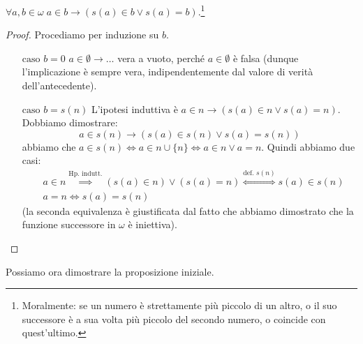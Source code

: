 \begin{lemma}
	$\forall a,b \in \omega \; a \in b \rightarrow (s(a) \in b \lor s(a) = b)$.\footnote{Moralmente: se un numero è strettamente più piccolo di un altro, o il suo successore è a sua volta più piccolo del secondo numero, o coincide con quest'ultimo.}
\end{lemma}

\begin{proof}
	Procediamo per induzione su $b$.
	\begin{itemize}
		\item[$\boxed{\text{caso $b = 0$}}$] $a \in \emptyset \rightarrow \ldots$ vera a vuoto, perché $a \in \emptyset$ è falsa (dunque l'implicazione è sempre vera, indipendentemente dal valore di verità dell'antecedente).
		\item[$\boxed{\text{caso $b = s(n)$}}$] L'ipotesi induttiva è $a \in n \rightarrow (s(a) \in n \lor s(a) = n)$. Dobbiamo dimostrare:
		\[ a \in s(n) \rightarrow (s(a) \in s(n) \lor s(a) = s(n))
			\]
		abbiamo che $a \in s(n) \iff a \in n \cup \{n\} \iff a \in n \lor a = n$. Quindi abbiamo due casi:
		\[ \begin{split}
			& a \in n \overset{\text{Hp. indutt.}}{\implies} (s(a) \in n) \lor (s(a) = n) \overset{\text{def. $s(n)$}}{\iff} s(a) \in s(n) \\
			& a = n \iff s(a) = s(n)
		\end{split}
			\]
		(la seconda equivalenza è giustificata dal fatto che abbiamo dimostrato che la funzione successore in $\omega$ è iniettiva).
	\end{itemize}
\end{proof}

Possiamo ora dimostrare la proposizione iniziale.

